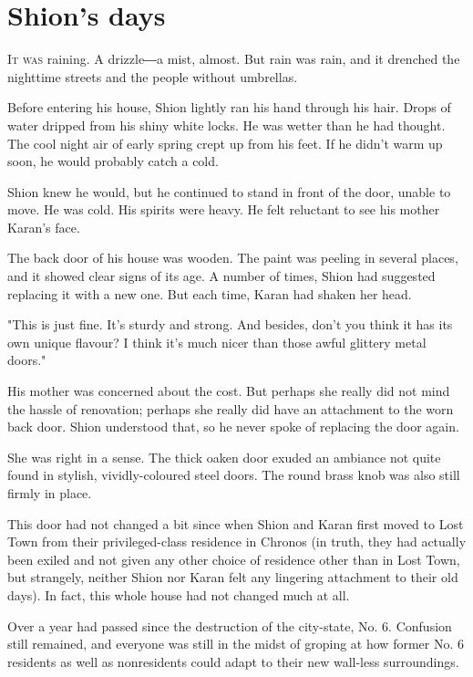 
\chapter{Shion's days}

\lettrine{I}{t was} raining. A drizzle―a mist, almost. But rain was rain, and it
drenched the nighttime streets and the people without umbrellas.

Before entering his house, Shion lightly ran his hand through his hair.
Drops of water dripped from his shiny white locks. He was wetter than he
had thought. The cool night air of early spring crept up from his feet.
If he didn't warm up soon, he would probably catch a cold.

Shion knew he would, but he continued to stand in front of the door,
unable to move. He was cold. His spirits were heavy. He felt reluctant
to see his mother Karan's face.

The back door of his house was wooden. The paint was peeling in several
places, and it showed clear signs of its age. A number of times, Shion
had suggested replacing it with a new one. But each time, Karan had
shaken her head.

"This is just fine. It's sturdy and strong. And besides, don't you think
it has its own unique flavour? I think it's much nicer than those awful
glittery metal doors."

His mother was concerned about the cost. But perhaps she really did not
mind the hassle of renovation; perhaps she really did have an attachment
to the worn back door. Shion understood that, so he never spoke of
replacing the door again.~

She was right in a sense. The thick oaken door exuded an ambiance not
quite found in stylish, vividly-coloured steel doors. The round brass
knob was also still firmly in place.

This door had not changed a bit since when Shion and Karan first moved
to Lost Town from their privileged-class residence in Chronos (in truth,
they had actually been exiled and not given any other choice of
residence other than in Lost Town, but strangely, neither Shion nor
Karan felt any lingering attachment to their old days). In fact, this
whole house had not changed much at all.

Over a year had passed since the destruction of the city-state, No. 6.
Confusion still remained, and everyone was still in the midst of groping
at how former No. 6 residents as well as nonresidents could adapt to
their new wall-less surroundings.

